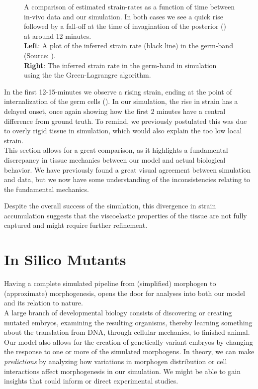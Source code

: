 \begin{figure}[H]
\begin{subfigure}{0.45\linewidth}
    \end{subfigure}
    \caption{A comparison of estimated strain-rates as a function of time between in-vivo data and our simulation. In both cases we see a quick rise followed by a fall-off at the time of invagination of the posterior () at around 12 minutes. \\\textbf{Left}: A plot of the inferred strain rate (black line) in the germ-band (Source: ). \\\textbf{Right}: The inferred strain rate in the germ-band in simulation using the the Green-Lagrangre algorithm.\\
   }
    \label{fig:strain}
\end{figure}

In the first 12-15-minutes we observe a rising strain, ending at the point of internalization of the germ cells (). In our simulation, the rise in strain has a delayed onset, once again showing how the first 2 minutes have a central difference from ground truth. To remind, we previously postulated this was due to overly rigid tissue in simulation, which would also explain the too low local strain.\\

This section allows for a great comparison, as it highlights a fundamental discrepancy in tissue mechanics between our model and actual biological behavior. We have previously found a great visual agreement between simulation and data, but we now have some understanding of the inconsistencies relating to the fundamental mechanics. 

Despite the overall success of the simulation, this divergence in strain accumulation suggests that the viscoelastic properties of the tissue are not fully captured and might require further refinement. 



\newpage
\section{In Silico Mutants}
Having a complete simulated pipeline from (simplified) morphogen to (approximate) morphogenesis, opens the door for analyses into both our model and its relation to nature. \\


A large branch of developmental biology consists of discovering or creating mutated embryos, examining the resulting organisms, thereby learning something about the translation from DNA, through cellular mechanics, to finished animal.\cite{gilmour2017morphogen}
Our model also allows for the creation of genetically-variant embryos by changing the response to one or more of the simulated morphogens. In theory, we can make \textit{predictions} by analyzing how variations in morphogen distribution or cell interactions affect morphogenesis in our simulation. We might be able to gain insights that could inform or direct experimental studies.\\

